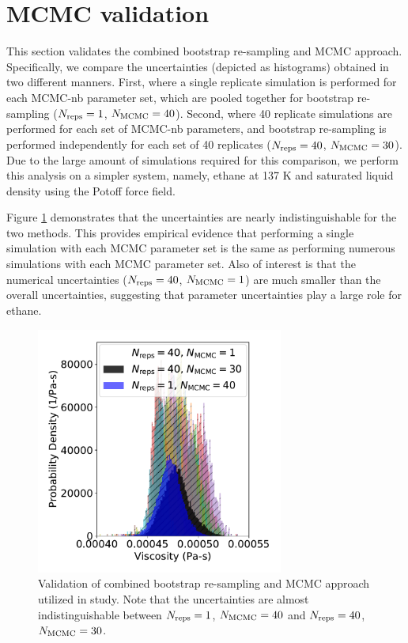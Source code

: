 \documentclass[preprint,review,11pt]{elsarticle}
\begin{document}
	\section{MCMC validation} \label{SI:MCMC_analysis}
	
	This section validates the combined bootstrap re-sampling and MCMC approach. Specifically, we compare the uncertainties (depicted as histograms) obtained in two different manners. First, where a single replicate simulation is performed for each MCMC-nb parameter set, which are pooled together for bootstrap re-sampling ($N_{\rm reps} = 1$, $N_{\rm MCMC} = 40$). Second, where 40 replicate simulations are performed for each set of MCMC-nb parameters, and bootstrap re-sampling is performed independently for each set of 40 replicates ($N_{\rm reps} = 40$, $N_{\rm MCMC} = 30$). Due to the large amount of simulations required for this comparison, we perform this analysis on a simpler system, namely, ethane at 137 K and saturated liquid density using the Potoff force field. 
	
	Figure \ref{fig:MCMC_validation} demonstrates that the uncertainties are nearly indistinguishable for the two methods. This provides empirical evidence that performing a single simulation with each MCMC parameter set is the same as performing numerous simulations with each MCMC parameter set. Also of interest is that the numerical uncertainties ($N_{\rm reps} = 40$, $N_{\rm MCMC} = 1$) are much smaller than the overall uncertainties, suggesting that parameter uncertainties play a large role for ethane.
	
	\begin{figure}[htb!]
		\centering
		\includegraphics[width=3.2in]{MCMC_validation.pdf}
		\caption{Validation of combined bootstrap re-sampling and MCMC approach utilized in study. Note that the uncertainties are almost indistinguishable between $N_{\rm reps} = 1$, $N_{\rm MCMC} = 40$ and $N_{\rm reps} = 40$, $N_{\rm MCMC} = 30$.}
		\label{fig:MCMC_validation}
	\end{figure}
	
\end{document}
